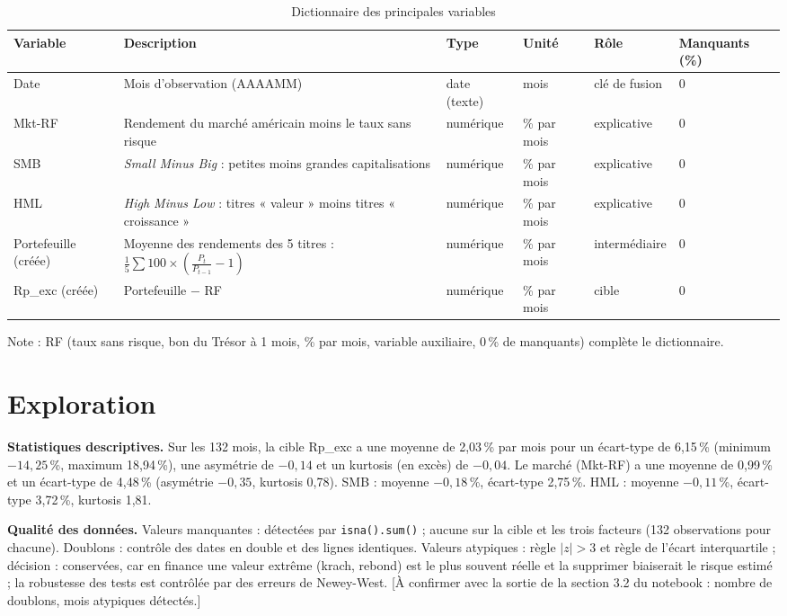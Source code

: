 \documentclass[11pt,a4paper]{article}
\newcommand{\pc}{\,\%}
\newcommand{\mkt}{Mkt-RF}
\newcommand{\rouge}[1]{#1}
\begin{document}
\begin{table}[H]
\centering
\caption{Dictionnaire des principales variables}
\small
\begin{tabularx}{\textwidth}{|p{2.2cm}|X|p{1.6cm}|p{1.6cm}|p{2cm}|p{1.5cm}|}
\hline
\textbf{Variable} & \textbf{Description} & \textbf{Type} & \textbf{Unité} & \textbf{Rôle} & \textbf{Manquants (\%)}\\\hline
Date & Mois d'observation (AAAAMM) & date (texte) & mois & clé de fusion & 0\\\hline
Mkt-RF & Rendement du marché américain moins le taux sans risque & numérique & \% par mois & explicative & 0\\\hline
SMB & \textit{Small Minus Big} : petites moins grandes capitalisations & numérique & \% par mois & explicative & 0\\\hline
HML & \textit{High Minus Low} : titres « valeur » moins titres « croissance » & numérique & \% par mois & explicative & 0\\\hline
Portefeuille (créée) & Moyenne des rendements des 5 titres : $\frac{1}{5}\sum 100\times\left(\frac{P_t}{P_{t-1}}-1\right)$ & numérique & \% par mois & intermédiaire & 0\\\hline
Rp\_exc (créée) & Portefeuille $-$ RF & numérique & \% par mois & cible & 0\\\hline
\end{tabularx}
\end{table}

Note : RF (taux sans risque, bon du Trésor à 1 mois, \% par mois, variable auxiliaire, 0\,\% de manquants) complète le dictionnaire.

\section{Exploration}

\textbf{Statistiques descriptives.} Sur les 132 mois, la cible Rp\_exc a une moyenne de 2,03\pc{} par mois pour un écart-type de 6,15\pc{} (minimum $-14{,}25$\pc, maximum 18,94\pc), une asymétrie de $-0{,}14$ et un kurtosis (en excès) de $-0{,}04$. Le marché (\mkt) a une moyenne de 0,99\pc{} et un écart-type de 4,48\pc{} (asymétrie $-0{,}35$, kurtosis 0,78). SMB : moyenne $-0{,}18$\pc, écart-type 2,75\pc. HML : moyenne $-0{,}11$\pc, écart-type 3,72\pc, kurtosis 1,81.

\textbf{Qualité des données.} Valeurs manquantes : détectées par \texttt{isna().sum()} ; aucune sur la cible et les trois facteurs (132 observations pour chacune). Doublons : contrôle des dates en double et des lignes identiques. Valeurs atypiques : règle $|z|>3$ et règle de l'écart interquartile ; décision : conservées, car en finance une valeur extrême (krach, rebond) est le plus souvent réelle et la supprimer biaiserait le risque estimé ; la robustesse des tests est contrôlée par des erreurs de Newey-West. \rouge{[À confirmer avec la sortie de la section 3.2 du notebook : nombre de doublons, mois atypiques détectés.]}
\end{document}
